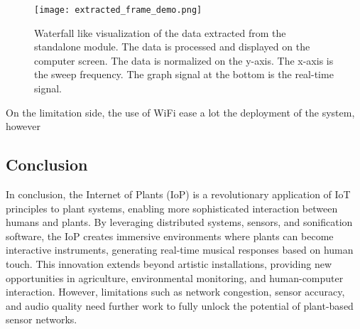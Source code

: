 \begin{figure}[h!]
    \centering
    \texttt{[image: extracted\_frame\_demo.png]}
    \caption{Waterfall like visualization of the data extracted from the standalone module. The data is processed and displayed on the computer screen. The data is normalized on the y-axis. The x-axis is the sweep frequency. The graph signal at the bottom is the real-time signal.}
    \vspace{0.1cm}
    \label{fig:extracted_frame_demo}
\end{figure}

On the limitation side, the use of WiFi ease a lot the deployment of the system, however

\subsection{Conclusion}

In conclusion, the Internet of Plants (IoP) is a revolutionary application of IoT principles to plant systems, enabling more sophisticated interaction between humans and plants. By leveraging distributed systems, sensors, and sonification software, the IoP creates immersive environments where plants can become interactive instruments, generating real-time musical responses based on human touch. This innovation extends beyond artistic installations, providing new opportunities in agriculture, environmental monitoring, and human-computer interaction. However, limitations such as network congestion, sensor accuracy, and audio quality need further work to fully unlock the potential of plant-based sensor networks.

